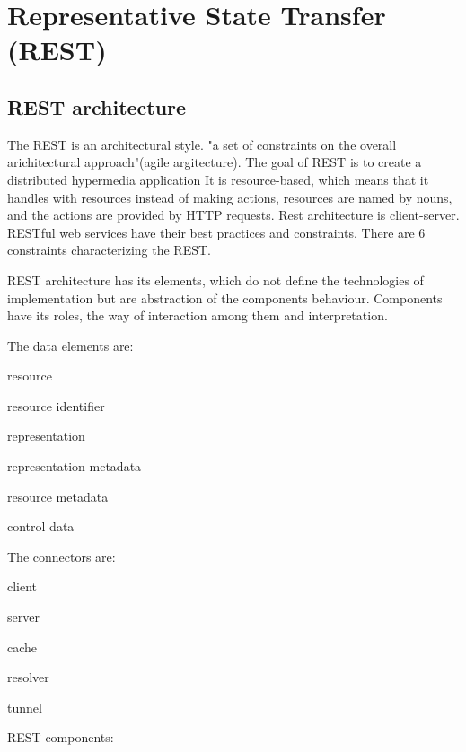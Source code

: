 \chapter{Representative State Transfer (REST)}
\label{chap:rest}


\section{REST architecture}
\label{sec:rest-architecture}

The REST is an architectural style. "a set of constraints on the overall arichitectural approach"(agile argitecture). The goal of REST is to create a distributed hypermedia application It is resource-based, which means that it handles with resources instead of making actions, resources are named by nouns, and the actions are provided by HTTP requests. Rest architecture is client-server.
RESTful web services have their best practices and constraints. There are 6 constraints characterizing the REST. 

REST architecture has its elements, which do not define the technologies of implementation but are abstraction of the components behaviour. Components have its roles, the way of interaction among them and interpretation.

The data elements are:

\begin{description}
  \item resource
  \item resource identifier
  \item representation
  \item representation metadata
  \item resource metadata
  \item control data
\end{description}

The connectors are:

\begin{description}
  \item client
  \item server
  \item cache
  \item resolver
  \item tunnel 
\end{description}

REST components:

